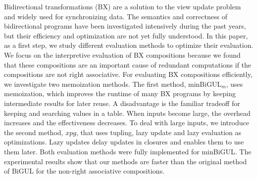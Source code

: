  Bidirectional transformations (BX) are a solution to the view update problem and widely used for synchronizing data. The semantics and correctness of bidirectional programs have been investigated intensively during the past years, but their efficiency and optimization are not yet fully understood. In this paper, as a first step, we study different evaluation methods to optimize their evaluation. We focus on the interpretive evaluation of BX compositions because we found that these compositions are an important cause of redundant computations if the compositions are not right associative. 
 For evaluating BX compositions efficiently, we investigate two memoization methods. The first method, minBiGUL$_m$, uses memoization, which improves the runtime of many BX programs by keeping intermediate results for later reuse. A disadvantage is the familiar tradeoff for keeping and searching values in a table.
  When inputs become large, the overhead increases and the effectiveness decreases. To deal with large inputs, we introduce the second method, $xpg$, that uses tupling, lazy update and lazy evaluation as optimizations. Lazy updates delay updates in closures and enables them to use them later.
  Both evaluation methods were fully implemented for minBiGUL. The experimental results show that our methods are faster than the original method of BiGUL for the non-right associative compositions.
